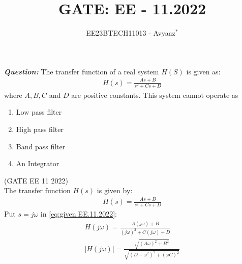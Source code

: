 \documentclass[journal,12pt,twocolumn]{IEEEtran}
\theoremstyle{remark}
\begin{document}

\vspace{3cm}

\title{GATE: EE - 11.2022}
\author{EE23BTECH11013 - Avyaaz$^{*}$%
}
\maketitle
\newpage
\bigskip

\renewcommand{\thefigure}{\arabic{figure}}
\renewcommand{\thetable}{\arabic{table}}

\large\textbf{\textsl{Question:}}
The transfer function of a real system $H(S)$ is given as:
\begin{align}
    H(s) = \frac{As + B}{s^2 + Cs + D}\nonumber
\end{align}
where $A, B, C$ and $D$ are positive constants. This system cannot operate as
\begin{enumerate}[label={(\Alph*)}]
    \item Low pass filter
    \item High pass filter
    \item Band pass filter
    \item An Integrator
\end{enumerate}\hfill(GATE EE 11 2022) \\
\solution
\fi
The transfer function $H(s)$ is given by: 
\begin{align}
    H(s) = \frac{As + B}{s^2 + Cs + D}\label{eq:given.EE.11.2022}
\end{align}
Put $s = j\omega$ in \eqref{eq:given.EE.11.2022}:
\begin{align}
    H(j\omega) = \frac{A(j\omega) + B}{(j\omega)^2 + C(j\omega) + D} \\
    |H(j\omega)| = \frac{\sqrt{(A\omega)^2 + B^2}}{\sqrt{(D - \omega^2)^2 + (\omega C)^2}}\label{eq:magnitude.EE.11.2022}
\end{align}
\end{document}
